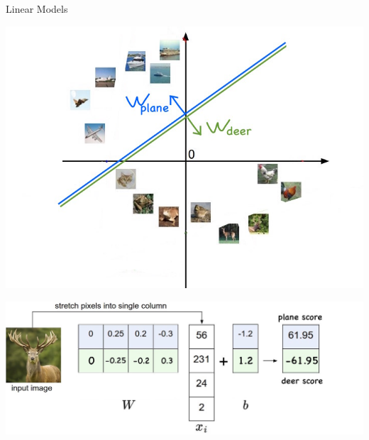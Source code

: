 \documentclass{beamer}
\begin{document}
\begin{frame}{Linear Models}
	\begin{center}
		\includegraphics[scale=0.27]{img/pclf2}
		
		\includegraphics[scale=0.15]{img/clf2}
	\end{center}

\end{frame}
\end{document}
